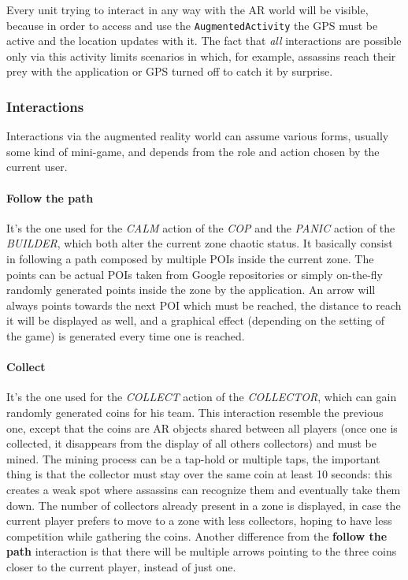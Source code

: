 			Every unit trying to interact in any way with the AR world will be visible, because in order to access and use the \lstinline|AugmentedActivity| the GPS must be active and the location updates with it.
			The fact that \emph{all} interactions are possible only via this activity limits scenarios in which, for example, assassins reach their prey with the application or GPS turned off to catch it by surprise.
			
			\subsubsection{Interactions}\label{focus:augmented:actions}
			
			Interactions via the augmented reality world can assume various forms, usually some kind of mini-game, and depends from the role and action chosen by the current user.
			
				\paragraph{Follow the path}
				It's the one used for the \emph{CALM} action of the \emph{COP} and the \emph{PANIC} action of the \emph{BUILDER}, which both alter the current zone chaotic status.
				It basically consist in following a path composed by multiple POIs inside the current zone. The points can be actual POIs taken from Google repositories or simply on-the-fly randomly generated points inside the zone by the application.
				An arrow will always points towards the next POI which must be reached, the distance to reach it will be displayed as well, and a graphical effect (depending on the setting of the game) is generated every time one is reached.
				
				\paragraph{Collect}
				It's the one used for the \emph{COLLECT} action of the \emph{COLLECTOR}, which can gain randomly generated coins for his team.
				This interaction resemble the previous one, except that the coins are AR objects shared between all players (once one is collected, it disappears from the display of all others collectors) and must be mined. The mining process can be a tap-hold or multiple taps, the important thing is that the collector must stay over the same coin at least 10 seconds: this creates a weak spot where assassins can recognize them and eventually take them down. The number of collectors already present in a zone is displayed, in case the current player prefers to move to a zone with less collectors, hoping to have less competition while gathering the coins.
				Another difference from the \textbf{follow the path} interaction is that there will be multiple arrows pointing to the three coins closer to the current player, instead of just one.
				

